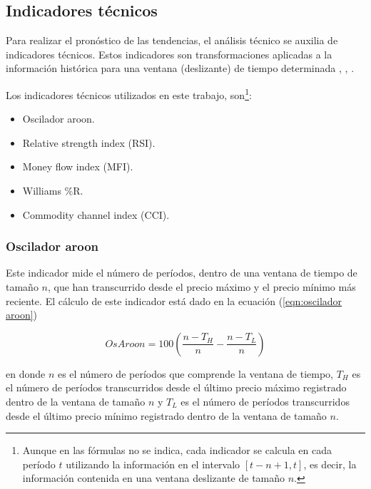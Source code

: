 \documentclass[12pt]{report}
\theoremstyle{break}
\theoremstyle{break}
\begin{document}
\subsection{Indicadores técnicos}
\label{subseccion:indicadores tecnicos}
Para realizar el pronóstico de las tendencias, el análisis técnico se auxilia de indicadores técnicos. Estos indicadores son transformaciones aplicadas a la información histórica para una ventana (deslizante) de tiempo determinada \cite{murphy1999technical}, \cite{technicalAnalysisKirkPatrick}, \cite{encycoplediaTechnicalIndicators}.

Los indicadores técnicos utilizados en este trabajo, son\footnote{Aunque en las fórmulas no se indica, cada indicador se calcula en cada período $t$ utilizando la información en el intervalo $\left[t-n + 1, t\right]$, es decir, la información contenida en una ventana deslizante de tamaño $n$. }:

\begin{itemize}
\item Oscilador aroon.

\item Relative strength index (RSI).

\item Money flow index (MFI).

\item Williams \%R.

\item Commodity channel index (CCI).
\end{itemize}


\subsubsection{Oscilador aroon}
\label{subsubseccion:Oscilador Aroon}
Este indicador mide el número de períodos, dentro de una ventana de tiempo de tamaño $n$, que han transcurrido desde el precio máximo y el precio mínimo más reciente. El cálculo de este indicador está dado en la ecuación (\ref{eqn:oscilador aroon})

\begin{equation} \label{eqn:oscilador aroon}
OsAroon = 100 \left( \dfrac{  n - T_H  } { n } - \dfrac{  n - T_L  } { n } \right)
\end{equation}

en donde $n$ es el número de períodos que comprende la ventana de tiempo, $T_H$ es el número de períodos transcurridos desde el último precio máximo registrado dentro de la ventana de tamaño $n$ y $T_L$ es el número de períodos transcurridos desde el último precio mínimo registrado dentro de la ventana de tamaño $n$.
\end{document}
